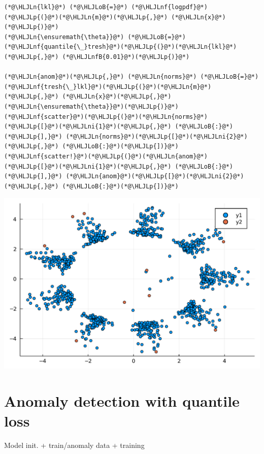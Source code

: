 \documentclass[12pt,a4paper]{article}
\newcommand{\HLJLn}[1]{#1}
\newcommand{\HLJLnf}[1]{\textcolor[RGB]{66,102,213}{#1}}
\newcommand{\HLJLnfB}[1]{\textcolor[RGB]{59,151,46}{#1}}
\newcommand{\HLJLni}[1]{\textcolor[RGB]{59,151,46}{#1}}
\newcommand{\HLJLoB}[1]{\textcolor[RGB]{102,102,102}{\textbf{#1}}}
\newcommand{\HLJLp}[1]{#1}
\begin{document}
\begin{lstlisting}
(*@\HLJLn{lkl}@*) (*@\HLJLoB{=}@*) (*@\HLJLnf{logpdf}@*)(*@\HLJLp{(}@*)(*@\HLJLn{m}@*)(*@\HLJLp{,}@*) (*@\HLJLn{x}@*)(*@\HLJLp{)}@*)
(*@\HLJLn{\ensuremath{\theta}}@*) (*@\HLJLoB{=}@*) (*@\HLJLnf{quantile{\_}tresh}@*)(*@\HLJLp{(}@*)(*@\HLJLn{lkl}@*)(*@\HLJLp{,}@*) (*@\HLJLnfB{0.01}@*)(*@\HLJLp{)}@*)

(*@\HLJLn{anom}@*)(*@\HLJLp{,}@*) (*@\HLJLn{norms}@*) (*@\HLJLoB{=}@*) (*@\HLJLnf{tresh{\_}lkl}@*)(*@\HLJLp{(}@*)(*@\HLJLn{m}@*)(*@\HLJLp{,}@*) (*@\HLJLn{x}@*)(*@\HLJLp{,}@*) (*@\HLJLn{\ensuremath{\theta}}@*)(*@\HLJLp{)}@*)
(*@\HLJLnf{scatter}@*)(*@\HLJLp{(}@*)(*@\HLJLn{norms}@*)(*@\HLJLp{[}@*)(*@\HLJLni{1}@*)(*@\HLJLp{,}@*) (*@\HLJLoB{:}@*)(*@\HLJLp{],}@*) (*@\HLJLn{norms}@*)(*@\HLJLp{[}@*)(*@\HLJLni{2}@*)(*@\HLJLp{,}@*) (*@\HLJLoB{:}@*)(*@\HLJLp{])}@*)
(*@\HLJLnf{scatter!}@*)(*@\HLJLp{(}@*)(*@\HLJLn{anom}@*)(*@\HLJLp{[}@*)(*@\HLJLni{1}@*)(*@\HLJLp{,}@*) (*@\HLJLoB{:}@*)(*@\HLJLp{],}@*) (*@\HLJLn{anom}@*)(*@\HLJLp{[}@*)(*@\HLJLni{2}@*)(*@\HLJLp{,}@*) (*@\HLJLoB{:}@*)(*@\HLJLp{])}@*)
\end{lstlisting}

\includegraphics[width=\linewidth]{jl_uOl600/test1_6_1.pdf}

\section{Anomaly detection with quantile loss}
Model init. + train/anomaly data + training
\end{document}
